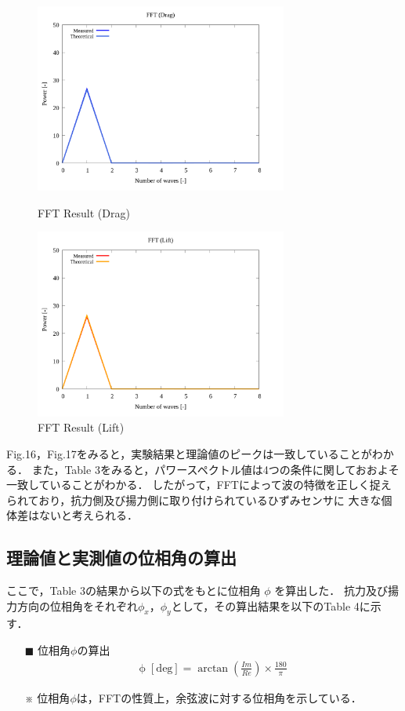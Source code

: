 \documentclass[twocolumn,a4j]{jsarticle}
\begin{document}
\begin{figure}[htbp]
    \footnotesize
    \begin{center}
        \includegraphics[width=83mm]{../images_2/27/27-3_fft-drag_summary.png}
        \caption{FFT Result (Drag)}
        \includegraphics[width=83mm]{../images_2/27/27-4_fft-lift_summary.png}
        \caption{FFT Result (Lift)}
    \end{center}
\end{figure}

Fig.16，Fig.17をみると，実験結果と理論値のピークは一致していることがわかる．
また，Table 3をみると，パワースペクトル値は4つの条件に関しておおよそ一致していることがわかる．
したがって，FFTによって波の特徴を正しく捉えられており，抗力側及び揚力側に取り付けられているひずみセンサに
大きな個体差はないと考えられる．

\newpage

\subsection{理論値と実測値の位相角の算出}

ここで，Table 3の結果から以下の式をもとに位相角 $\phi$ を算出した．
抗力及び揚力方向の位相角をそれぞれ$\phi_x$，$\phi_y$として，その算出結果を以下のTable 4に示す．

\begin{itemize}
    \item [$\blacksquare$] 位相角$\phi$の算出
    \begin{eqnarray*}
        \mathrm{\phi \; [deg]} = \arctan \left(\frac{Im}{Re}\right) × \frac{180}{\pi}
    \end{eqnarray*}    
    \item [※] 位相角$\phi$は，FFTの性質上，余弦波に対する位相角を示している．
\end{itemize}
\end{document}
